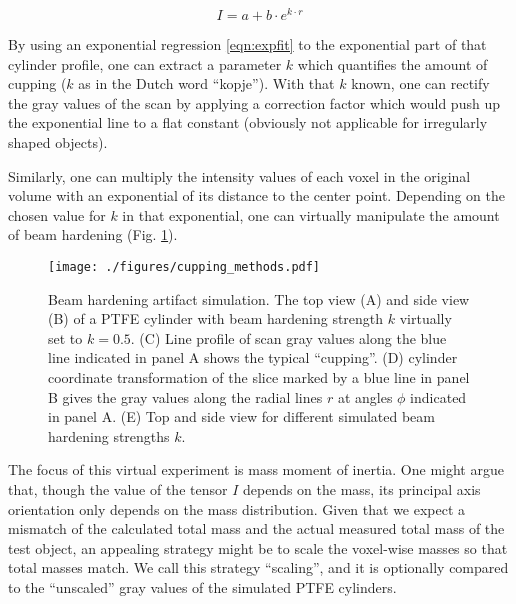 \begin{equation}\label{eqn:expfit}
 I = a+b\cdot e^{k\cdot r}
\end{equation}

By using an exponential regression \eqref{eqn:expfit} to the exponential part of that cylinder profile, one can extract a parameter \(k\) which quantifies the amount of cupping (\(k\) as in the Dutch word ``kopje'').
With that \(k\) known, one can rectify the gray values of the scan by applying a correction factor which would push up the exponential line to a flat constant (obviously not applicable for irregularly shaped objects).

Similarly, one can multiply the intensity values of each voxel in the original volume with an exponential of its distance to the center point.
Depending on the chosen value for \(k\) in that exponential, one can virtually manipulate the amount of beam hardening (Fig. \ref{fig:cupping_methods}).


\begin{figure}[p]
\centering
\texttt{[image: ./figures/cupping\_methods.pdf]}
\caption{\label{fig:cupping_methods}Beam hardening artifact simulation. The top view (A) and side view (B) of a PTFE cylinder with beam hardening strength \(k\) virtually set to \(k=0.5\). (C) Line profile of scan gray values along the blue line indicated in panel A shows the typical ``cupping''. (D) cylinder coordinate transformation of the slice marked by a blue line in panel B gives the gray values along the radial lines \(r\) at angles \(\phi\) indicated in panel A. (E) Top and side view for different simulated beam hardening strengths \(k\).}
\end{figure}


The focus of this virtual experiment is mass moment of inertia.
One might argue that, though the value of the tensor \(I\) depends on the mass, its principal axis orientation only depends on the mass distribution.
Given that we expect a mismatch of the calculated total mass and the actual measured total mass of the test object, an appealing strategy might be to scale the voxel-wise masses so that total masses match.
We call this strategy ``scaling'', and it is optionally compared to the ``unscaled'' gray values of the simulated PTFE cylinders.



